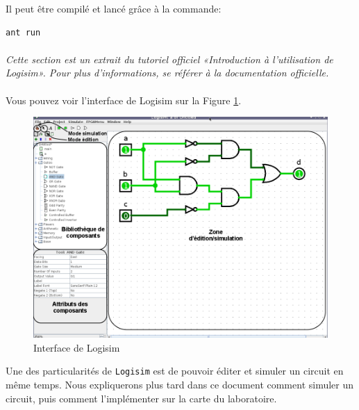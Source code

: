 Il peut être compilé et lancé grâce à la commande:
\begin{lstlisting}
ant run
\end{lstlisting}

\paragraph{}

\textit{Cette section est un extrait du tutoriel officiel «Introduction à l’utilisation de Logisim». Pour plus d'informations, se référer à la documentation officielle.}
\paragraph{}

Vous pouvez voir l'interface de Logisim sur la Figure  \ref{fig_logisim_description}.

\begin{figure}[t]
\begin{center}
\includegraphics[width=500pt]{pictures/Logisim_description.png}
\caption{\label{fig_logisim_description}Interface de Logisim}
\end{center}
\end{figure}

Une des particularités de \texttt{Logisim} est de pouvoir éditer et simuler un circuit en même temps.
Nous expliquerons plus tard dans ce document comment simuler un circuit, puis comment l'implémenter sur la carte du
laboratoire.


